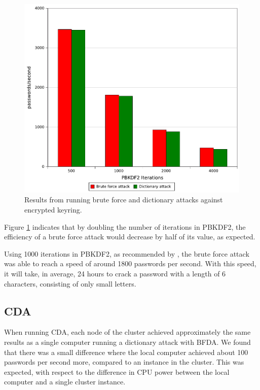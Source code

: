 \documentclass[pdftex,english,10pt,b5paper,twoside]{book}
\begin{document}
\begin{figure}[!h]
\centering
\includegraphics[scale=0.55]{graph_pbkdf2.pdf}
\caption{Results from running brute force and dictionary attacks against encrypted keyring.}
\label{fig:bfres}
\end{figure}

Figure \ref{fig:bfres} indicates that by doubling the number of iterations in
PBKDF2, the efficiency of a brute force attack would decrease by half of
its value, as expected.

Using 1000 iterations in \ac{PBKDF2}, as recommended by \citet{pbkdf2std}, the
brute force attack was able to reach a speed of around 1800 passwords per
second. With this speed, it will take, in average, 24 hours to crack a password
with a length of 6 characters, consisting of only small letters.

\subsection{\acl{CDA}}

When running \ac{CDA}, each node of the cluster achieved approximately the same
results as a single computer running a dictionary attack with \ac{BFDA}. We
found that there was a small difference where the local computer achieved about
100 passwords per second more, compared to an instance in the cluster. This was
expected, with respect to the difference in \ac{CPU} power between the local
computer and a single cluster instance. 
\end{document}
